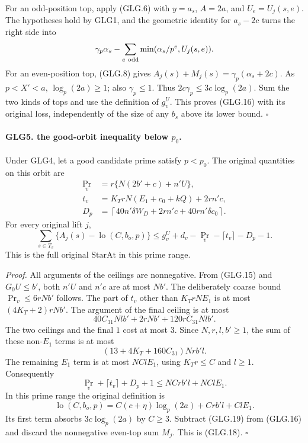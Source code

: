 For an odd-position top, apply (GLG.6) with
\(y=a_s\), \(A=2a\), and \(U_e=U_j(s,e)\). The hypotheses
hold by GLG1, and the geometric identity for \(a_s-2c\)
turns the right side into
\[
 \gamma_p\alpha_s-\sum_{e\ {\rm odd}}
                         \min(\alpha_s/p^e,U_j(s,e)).
 \]
For an even-position top, (GLG.8) gives
\(A_j(s)+M_j(s)=\gamma_p(\alpha_s+2c)\).
As \(p<X'<a\), \(\log_p(2a)\ge1\); also \(\gamma_p\le1\).
Thus \(2c\gamma_p\le3c\log_p(2a)\).
Sum the two kinds of tops and use the definition of \(g_v^U\).
This proves (GLG.16) with its original loss, independently of
the size of any \(b_s\) above its lower bound.
\hfill\(\square\)

\paragraph{GLG5. the good-orbit inequality below \(p_0\).}
\label{claim:GLG5}
Under GLG4, let a good candidate prime satisfy \(p<p_0\).
The original quantities on this orbit are
\[
 \begin{split}
 \Pr_v&=r\{N(2b'+c)+n'U\},\\
 t_v&=K_TrN(E_1+c_0+kQ)+2rn'c,\\
 D_p&=\left\lceil40n'\delta W_D+2rn'c
                                      +40rn'\delta c_0\right\rceil .
 \end{split}                                                       \tag{GLG.17}
\]
For every original lift \(j\),
\[
 \sum_{s\in T_v}\{A_j(s)-\operatorname{lo}(C,b_o,p)\}
       \le g_v^U+d_v-\Pr_v-\lceil t_v\rceil-D_p-1.                 \tag{GLG.18}
\]
This is the full original \(\mathrm{StarAt}\) in this prime range.

\emph{Proof.}
All arguments of the ceilings are nonnegative. From (GLG.15)
and \(G_0U\le b'\), both \(n'U\) and \(n'c\) are at most
\(Nb'\). The deliberately coarse bound
\(\Pr_v\le6rNb'\) follows. The part of \(t_v\) other than
\(K_TrNE_1\) is at most \((4K_T+2)rNb'\).
The argument of the final ceiling is at most
\[
       40C_{31}Nl b'+2rNb'+120rC_{31}Nl b'.
 \]
The two ceilings and the final \(1\) cost at most \(3\).
Since \(N,r,l,b'\ge1\), the sum of these non-\(E_1\) terms
is at most
\[
              (13+4K_T+160C_{31})Nr b'l .
 \]
The remaining \(E_1\) term is at most \(NClE_1\), using
\(K_Tr\le C\) and \(l\ge1\). Consequently
\[
       \Pr_v+\lceil t_v\rceil+D_p+1
                        \le NCr b'l+NClE_1.                     \tag{GLG.19}
\]
In this prime range the original definition is
\[
 \operatorname{lo}(C,b_o,p)
             =C(c+\eta)\log_p(2a)+Crb'l+ClE_1.
 \]
Its first term absorbs \(3c\log_p(2a)\) by \(C\ge3\).
Subtract (GLG.19) from (GLG.16) and discard the nonnegative
even-top sum \(M_j\). This is (GLG.18).
\hfill\(\square\)

